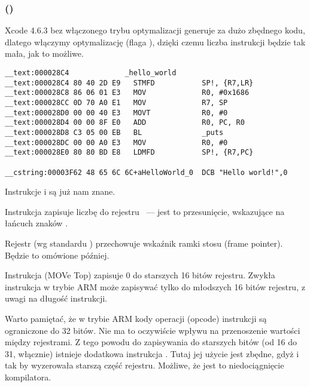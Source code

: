 \subsubsection{\OptimizingXcodeIV (\ARMMode)}

Xcode 4.6.3 bez włączonego trybu optymalizacji generuje za dużo zbędnego kodu, dlatego włączymy optymalizację (flaga \Othree), dzięki czemu liczba instrukcji będzie tak mała, jak to możliwe.

\begin{lstlisting}[caption=\OptimizingXcodeIV (\ARMMode),style=customasmARM]
__text:000028C4             _hello_world
__text:000028C4 80 40 2D E9   STMFD           SP!, {R7,LR}
__text:000028C8 86 06 01 E3   MOV             R0, #0x1686
__text:000028CC 0D 70 A0 E1   MOV             R7, SP
__text:000028D0 00 00 40 E3   MOVT            R0, #0
__text:000028D4 00 00 8F E0   ADD             R0, PC, R0
__text:000028D8 C3 05 00 EB   BL              _puts
__text:000028DC 00 00 A0 E3   MOV             R0, #0
__text:000028E0 80 80 BD E8   LDMFD           SP!, {R7,PC}

__cstring:00003F62 48 65 6C 6C+aHelloWorld_0  DCB "Hello world!",0
\end{lstlisting}

Instrukcje  i  są już nam znane.

Instrukcja \MOV zapisuje liczbę  do rejestru ~--- jest to przesunięcie, wskazujące na łańcuch znaków .

Rejestr  (wg standardu \IOSABI) przechowuje wskaźnik ramki stosu (frame pointer). Będzie to omówione później.

Instrukcja  (MOVe Top) zapisuje 0 do starszych 16 bitów rejestru.
Zwykła instrukcja \MOV w trybie ARM może zapisywać tylko do młodszych 16 bitów rejestru, z uwagi na długość instrukcji.

Warto pamiętać, że w trybie ARM kody operacji (opcode) instrukcji są ograniczone do 32 bitów. Nie ma to oczywiście wpływu na przenoszenie wartości między rejestrami.
Z tego powodu do zapisywania do starszych bitów (od 16 do 31, włącznie) istnieje dodatkowa instrukcja .
Tutaj jej użycie jest zbędne, gdyż  i tak by wyzerowała starszą część rejestru.
Możliwe, że jest to niedociągnięcie kompilatora.

